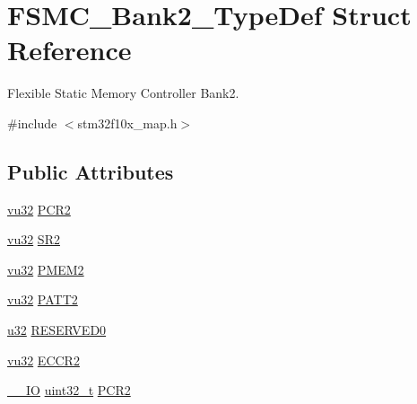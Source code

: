 \hypertarget{struct_f_s_m_c___bank2___type_def}{}\section{F\+S\+M\+C\+\_\+\+Bank2\+\_\+\+Type\+Def Struct Reference}
\label{struct_f_s_m_c___bank2___type_def}


Flexible Static Memory Controller Bank2.  




{\ttfamily \#include $<$stm32f10x\+\_\+map.\+h$>$}

\subsection*{Public Attributes}
\begin{DoxyCompactItemize}
\item 
\hyperlink{agilefox_2library_2inc_2stm32f10x__type_8h_a6e2761f0a1011f84ed96b946f2c8a563}{vu32} \hyperlink{struct_f_s_m_c___bank2___type_def_a771b1042772a05bf3838eae862598ff5}{P\+C\+R2}
\item 
\hyperlink{agilefox_2library_2inc_2stm32f10x__type_8h_a6e2761f0a1011f84ed96b946f2c8a563}{vu32} \hyperlink{struct_f_s_m_c___bank2___type_def_a5223b1e5429e9186ae2d89ddd55414e7}{S\+R2}
\item 
\hyperlink{agilefox_2library_2inc_2stm32f10x__type_8h_a6e2761f0a1011f84ed96b946f2c8a563}{vu32} \hyperlink{struct_f_s_m_c___bank2___type_def_a15b10ce81d0cb86a38c1079ce02ba0ee}{P\+M\+E\+M2}
\item 
\hyperlink{agilefox_2library_2inc_2stm32f10x__type_8h_a6e2761f0a1011f84ed96b946f2c8a563}{vu32} \hyperlink{struct_f_s_m_c___bank2___type_def_a98dded256197c96cab08eaafe0519edb}{P\+A\+T\+T2}
\item 
\hyperlink{agilefox_2library_2inc_2stm32f10x__type_8h_a2caf5cd7bcdbe1eefa727f44ffb10bac}{u32} \hyperlink{struct_f_s_m_c___bank2___type_def_aa2d746d7182d22552ee3396102c4feb6}{R\+E\+S\+E\+R\+V\+E\+D0}
\item 
\hyperlink{agilefox_2library_2inc_2stm32f10x__type_8h_a6e2761f0a1011f84ed96b946f2c8a563}{vu32} \hyperlink{struct_f_s_m_c___bank2___type_def_a1358cc808bc266e71043dd345f7fea84}{E\+C\+C\+R2}
\item 
\hyperlink{group___c_m_s_i_s___c_m3__core__definitions_gaec43007d9998a0a0e01faede4133d6be}{\+\_\+\+\_\+\+IO} \hyperlink{_p_e___types_8h_a33594304e786b158f3fb30289278f5af}{uint32\+\_\+t} \hyperlink{struct_f_s_m_c___bank2___type_def_ad1eabc89a4eadb5cc6a42c1e39a39ff8}{P\+C\+R2}

\end{DoxyCompactItemize}
